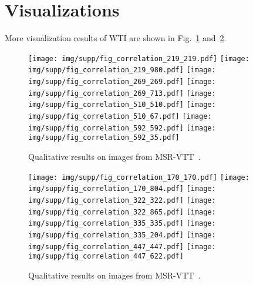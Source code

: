 \documentclass[runningheads]{llncs}
\begin{document}
\section{Visualizations}

More visualization results of WTI are shown in Fig.~\ref{fig:msrvtt1} and~\ref{fig:msrvtt2}.




\begin{figure}[h]
\centering
\texttt{[image: img/supp/fig\_correlation\_219\_219.pdf]}
\texttt{[image: img/supp/fig\_correlation\_219\_980.pdf]}
\texttt{[image: img/supp/fig\_correlation\_269\_269.pdf]}
\texttt{[image: img/supp/fig\_correlation\_269\_713.pdf]}
\texttt{[image: img/supp/fig\_correlation\_510\_510.pdf]}
\texttt{[image: img/supp/fig\_correlation\_510\_67.pdf]}
\texttt{[image: img/supp/fig\_correlation\_592\_592.pdf]}
\texttt{[image: img/supp/fig\_correlation\_592\_35.pdf]}
\caption{Qualitative results on images from MSR-VTT~\cite{msrvtt}.}
\label{fig:msrvtt1}
\end{figure}



\begin{figure}[h]
\centering
\texttt{[image: img/supp/fig\_correlation\_170\_170.pdf]}
\texttt{[image: img/supp/fig\_correlation\_170\_804.pdf]}
\texttt{[image: img/supp/fig\_correlation\_322\_322.pdf]}
\texttt{[image: img/supp/fig\_correlation\_322\_865.pdf]}
\texttt{[image: img/supp/fig\_correlation\_335\_335.pdf]}
\texttt{[image: img/supp/fig\_correlation\_335\_204.pdf]}
\texttt{[image: img/supp/fig\_correlation\_447\_447.pdf]}
\texttt{[image: img/supp/fig\_correlation\_447\_622.pdf]}
\caption{Qualitative results on images from MSR-VTT~\cite{msrvtt}.}
\label{fig:msrvtt2}
\end{figure}

\clearpage


\end{document}
